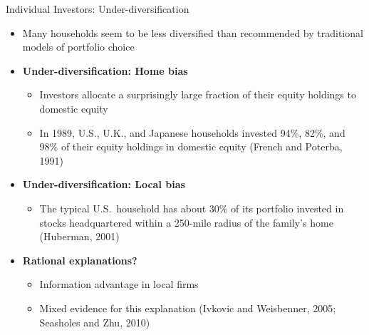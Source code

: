 \documentclass[aspectratio=169, 11pt]{beamer}
\begin{document}
\begin{frame}[shrink=10]{Individual Investors: Under-diversification}
\footnotesize
\begin{itemize}
\item Many households seem to be less diversified than recommended by traditional models of portfolio choice
\item \textbf{Under-diversification: Home bias}
  \begin{itemize}
  \item Investors allocate a surprisingly large fraction of their equity holdings to domestic equity
  \item In 1989, U.S., U.K., and Japanese households invested 94\%, 82\%, and 98\% of their equity holdings in domestic equity (French and Poterba, 1991)
  \end{itemize}
\item \textbf{Under-diversification: Local bias}
  \begin{itemize}
  \item The typical U.S.\ household has about 30\% of its portfolio invested in stocks headquartered within a 250-mile radius of the family's home (Huberman, 2001)
  \end{itemize}
\item \textbf{Rational explanations?}
  \begin{itemize}
  \item Information advantage in local firms
  \item Mixed evidence for this explanation (Ivkovic and Weisbenner, 2005; Seasholes and Zhu, 2010)
  \end{itemize}
\end{itemize}
\end{frame}
\end{document}

